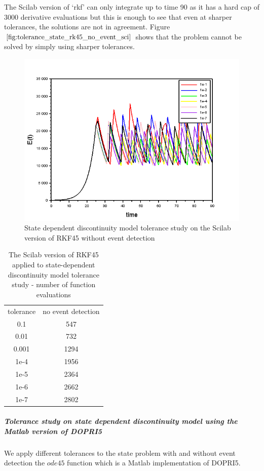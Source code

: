 The Scilab version of `rkf' can only integrate up to time 90 as it has a hard cap of 3000 derivative evaluations but this is enough to see that even at sharper tolerances, the solutions are not in agreement. Figure $\ref{fig:tolerance_state_rk45_no_event_sci}$ shows that the problem cannot be solved by simply using sharper tolerances. 
\begin{figure}[h]
\centering
\includegraphics[width=0.7\linewidth]{./figures/tolerance_state_rk45_no_event_sci}
\caption{State dependent discontinuity model tolerance study on the Scilab version of RKF45 without event detection}
\label{fig:tolerance_state_rk45_no_event_sci}
\end{figure}

\begin{table}[h]
\caption {The Scilab version of RKF45 applied to state-dependent discontinuity model tolerance study - number of function evaluations} \label{tab:tolerance_state_discontinuity_rk45_scilab} 
\begin{center}
\begin{tabular}{ c c }
tolerance & no event detection \\ 
0.1 & 547 \\
0.01 & 732 \\
0.001 & 1294 \\
1e-4 & 1956 \\
1e-5 & 2364 \\
1e-6 & 2662 \\
1e-7 & 2802 \\
\end{tabular}
\end{center}
\end{table}

\subparagraph{Tolerance study on state dependent discontinuity model using the Matlab version of DOPRI5}
We apply different tolerances to the state problem with and without event detection the $ode45$ function which is a Matlab implementation of DOPRI5.

